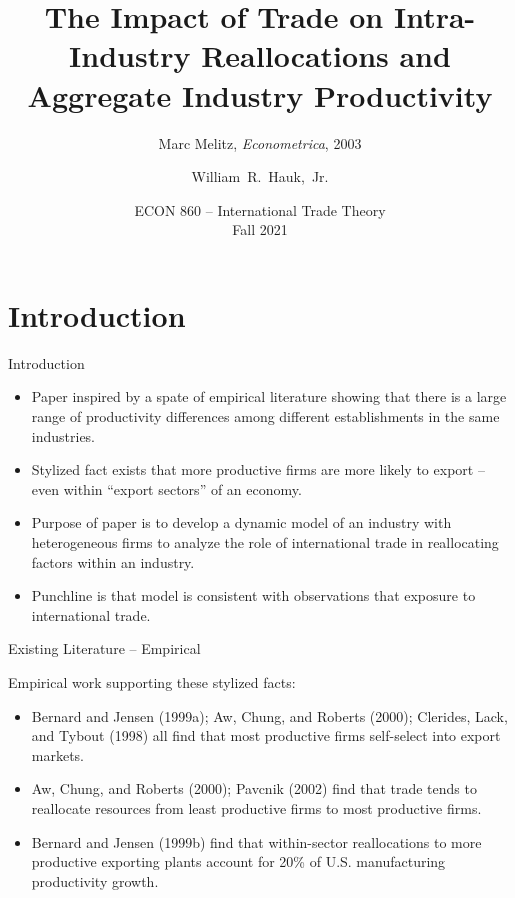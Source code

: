 \documentclass[aspectratio=169]{beamer}
\title[Melitz (2003)] %
{The Impact of Trade on Intra-Industry Reallocations and Aggregate Industry Productivity}
\subtitle{Marc Melitz, \emph{Econometrica}, 2003}
\author [Hauk] %
{William~R.~Hauk,~Jr.} %
\institute[UofSC] %
{
  Darla Moore School of Business\\
  University of South Carolina
}
\date[ECON 860, Fall 2021] %
{ECON 860 -- International Trade Theory\\Fall 2021}
\begin{document}
\frame{\titlepage}


\section{Introduction}


\begin{frame}{Introduction}

\begin{itemize}
    \item<1-> Paper inspired by a spate of empirical literature showing that there is a large range of productivity differences among different establishments in the same industries.
    \item<2-> Stylized fact exists that more productive firms are more likely to export – even within ``export sectors” of an economy.
    \item<3-> Purpose of paper is to develop a dynamic model of an industry with heterogeneous firms to analyze the role of international trade in reallocating factors within an industry.
    \item<4-> Punchline is that model is consistent with observations that exposure to international trade.
\end{itemize}
    
\end{frame}


\begin{frame}{Existing Literature -- Empirical}

Empirical work supporting these stylized facts:

\begin{itemize}
    \item<1-> Bernard and Jensen (1999a); Aw, Chung, and Roberts (2000); Clerides, Lack, and Tybout (1998) all find that most productive firms self-select into export markets.
    \item<2-> Aw, Chung, and Roberts (2000); Pavcnik (2002) find that trade tends to reallocate resources from least productive firms to most productive firms.
    \item<3-> Bernard and Jensen (1999b) find that within-sector reallocations to more productive exporting plants account for 20\% of U.S. manufacturing productivity growth.
\end{itemize}
    
\end{frame}
\end{document}
